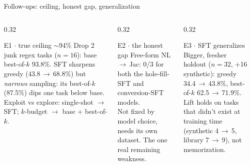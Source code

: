 \documentclass[aspectratio=169,10pt]{beamer}
\begin{document}
\begin{frame}{Follow-ups: ceiling, honest gap, generalization}
  \small
  \begin{columns}[T]
    \begin{column}{0.32\textwidth}
      \begin{block}{E1 $\cdot$ true ceiling $\sim$94\%}
        Drop 2 junk regex tasks ($n=16$): base best-of-$k$ 93.8\%.
        SFT sharpens greedy (43.8\,$\rightarrow$\,68.8\%) but \emph{narrows} sampling: its best-of-$k$ (87.5\%) dips one task below base.
        \\[1mm]\alert{Exploit vs explore:} single-shot $\rightarrow$ SFT; $k$-budget $\rightarrow$ base + best-of-$k$.
      \end{block}
    \end{column}
    \begin{column}{0.32\textwidth}
      \begin{block}{E2 $\cdot$ the honest gap}
        Free-form NL\,$\rightarrow$\,Jac: 0/3 for both the hole-fill-SFT and conversion-SFT models.
        \\[1mm]Not fixed by model choice, needs its own dataset. The one real remaining weakness.
      \end{block}
    \end{column}
    \begin{column}{0.32\textwidth}
      \begin{block}{E3 $\cdot$ SFT generalizes}
        Bigger, fresher holdout ($n=32$, +16 synthetic): greedy 34.4\,$\rightarrow$\,43.8\%, best-of-$k$ 62.5\,$\rightarrow$\,71.9\%.
        \\[1mm]Lift holds on tasks that didn't exist at training time (synthetic 4\,$\rightarrow$\,5, library 7\,$\rightarrow$\,9), not memorization.
      \end{block}
    \end{column}
  \end{columns}
\end{frame}
\end{document}
